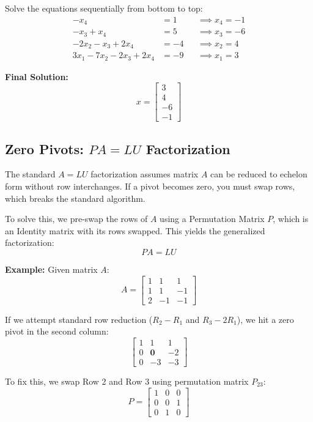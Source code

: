 \documentclass[../linear-algebra.tex]{subfiles}
\begin{document}
\noindent Solve the equations sequentially from bottom to top:
\[
\begin{aligned}
-x_4 &= 1 &&\implies x_4 = -1 \\
-x_3 + x_4 &= 5 &&\implies x_3 = -6 \\
-2x_2 - x_3 + 2x_4 &= -4 &&\implies x_2 = 4 \\
3x_1 - 7x_2 - 2x_3 + 2x_4 &= -9 &&\implies x_1 = 3
\end{aligned}
\]

\noindent\textbf{Final Solution:}
\[
x = \begin{bmatrix} 3 \\ 4 \\ -6 \\ -1 \end{bmatrix}
\]

\subsection{Zero Pivots: $PA = LU$ Factorization}
The standard $A = LU$ factorization assumes matrix $A$ can be reduced to echelon form without row interchanges. If a pivot becomes zero, you must swap rows, which breaks the standard algorithm. 

\noindent To solve this, we pre-swap the rows of $A$ using a Permutation Matrix $P$, which is an Identity matrix with its rows swapped. This yields the generalized factorization:
\[
PA = LU
\]

\noindent\textbf{Example:}
Given matrix $A$:
\[
A = \begin{bmatrix} 1 & 1 & 1 \\ 1 & 1 & -1 \\ 2 & -1 & -1 \end{bmatrix}
\]

\noindent If we attempt standard row reduction ($R_2 - R_1$ and $R_3 - 2R_1$), we hit a zero pivot in the second column:
\[
\begin{bmatrix} 1 & 1 & 1 \\ 0 & \mathbf{0} & -2 \\ 0 & -3 & -3 \end{bmatrix}
\]

\noindent To fix this, we swap Row 2 and Row 3 using permutation matrix $P_{23}$:
\[
P = \begin{bmatrix} 1 & 0 & 0 \\ 0 & 0 & 1 \\ 0 & 1 & 0 \end{bmatrix}
\]
\end{document}
